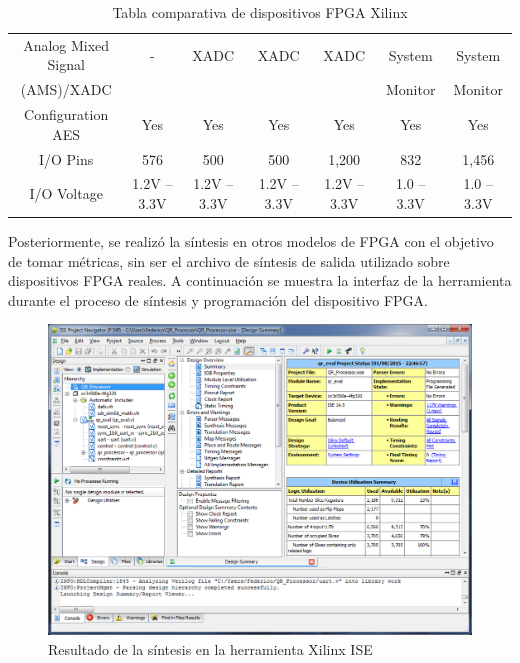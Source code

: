 \begin{table}[h!]
\begin{center}
\begin{tabular}{|c|c|c|c|c|c|c|}
         Analog Mixed Signal     & -           & XADC        & XADC        & XADC        & System      & System      \\ 
         (AMS)/XADC              &             &             &             &             & Monitor     & Monitor     \\ \hline
         Configuration AES       & Yes         & Yes         & Yes         & Yes         & Yes         & Yes         \\ \hline
         I/O Pins                & 576         & 500         & 500         & 1,200       & 832         & 1,456       \\ \hline
         I/O Voltage             & 1.2V – 3.3V & 1.2V – 3.3V & 1.2V – 3.3V & 1.2V – 3.3V & 1.0 – 3.3V  & 1.0 – 3.3V  \\ \hline
      \end{tabular}
      \caption{Tabla comparativa de dispositivos FPGA Xilinx}
      \normalsize
   \end{center}
\end{table}

Posteriormente, se realizó la síntesis en otros modelos de FPGA con el objetivo de tomar métricas, sin ser el archivo de síntesis de salida utilizado sobre dispositivos FPGA reales. A continuación se muestra la interfaz de la herramienta durante el proceso de síntesis y programación del dispositivo FPGA.

\begin{figure}[!h]
  \begin{center}
    \includegraphics[width=10 cm]{./figures/C05-ISE_synthesis}
    \caption{Resultado de la síntesis en la herramienta Xilinx ISE}
    \label{fig:ISE_synthesis}
  \end{center}
\end{figure}

\newpage

